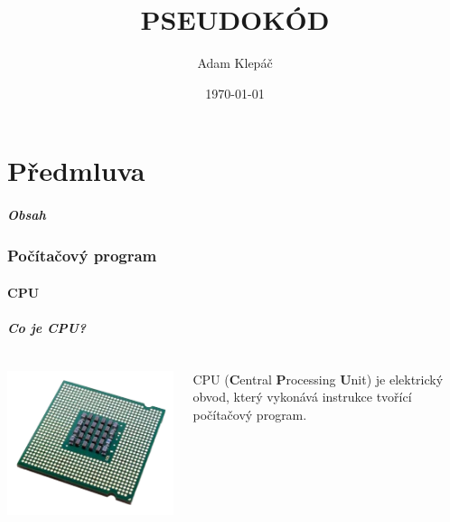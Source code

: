 \documentclass[aspectratio=169,11pt,handout]{beamer}
\title{PSEUDOKÓD}
\date{\today}
\author{Adam Klepáč}
\institute[GEVO]{Gymnázium Evolution Jižní Město}
\begin{document}
\maketitle

\part[Předmluva]{Předmluva}

\begin{frame}
 \partpage
\end{frame}

\begin{frame}
 \frametitle{Obsah}
 \tableofcontents
\end{frame}

\section[Program]{Počítačový program}
\subsection[CPU]{CPU}

\begin{frame}
 \frametitle{Co je CPU?}
 \begin{columns}
  \begin{column}{.3\textwidth}
   \includegraphics[width=\textwidth]{cpu}
  \end{column}
  \begin{column}{.7\textwidth}
   \begin{tcolorbox}
    CPU (\textbf{C}entral \textbf{P}rocessing \textbf{U}nit) je elektrický
    obvod, který vykonává \alert{instrukce} tvořící \alert{počítačový program}.
   \end{tcolorbox}
  \end{column}
 \end{columns}
\end{frame}
\end{document}

